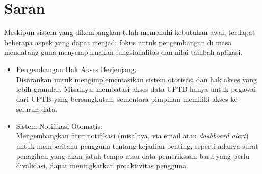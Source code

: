 \section{Saran}
\label{sec:saran}

Meskipun sistem yang dikembangkan telah memenuhi kebutuhan awal, terdapat beberapa aspek yang dapat menjadi fokus untuk pengembangan di masa mendatang guna menyempurnakan fungsionalitas dan nilai tambah aplikasi.
\begin{itemize}
    \item Pengembangan Hak Akses Berjenjang: \\
    Disarankan untuk mengimplementasikan sistem otorisasi dan hak akses yang lebih granular. Misalnya, membatasi akses data UPTB hanya untuk pegawai dari UPTB yang bersangkutan, sementara pimpinan memiliki akses ke seluruh data.
    \item Sistem Notifikasi Otomatis: \\
    Mengembangkan fitur notifikasi (misalnya, via email atau \emph{dashboard alert}) untuk memberitahu pengguna tentang kejadian penting, seperti adanya surat penagihan yang akan jatuh tempo atau data pemeriksaan baru yang perlu divalidasi, dapat meningkatkan proaktivitas pengguna.
\end{itemize}